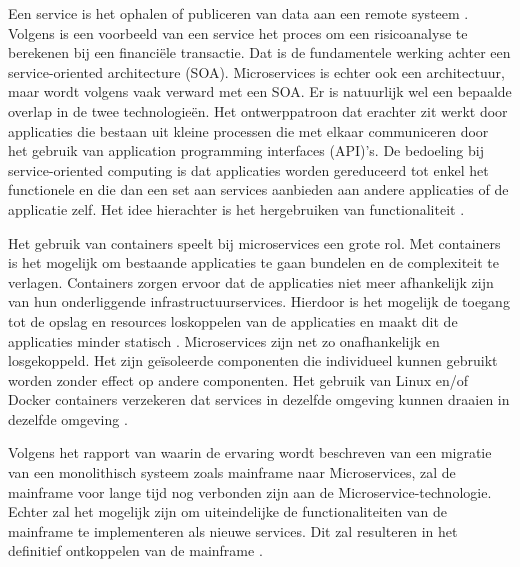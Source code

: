 Een service is het ophalen of publiceren van data aan een remote systeem \autocite{Linthicum2016}. Volgens \citeauthor{Linthicum2016} is een voorbeeld van een service het proces om een risicoanalyse te berekenen bij een financiële transactie. Dat is de fundamentele werking achter een service-oriented architecture (SOA). Microservices is echter ook een architectuur, maar wordt volgens \citeauthor{Linthicum2016} vaak verward met een SOA. Er is natuurlijk wel een bepaalde overlap in de twee technologieën. Het ontwerppatroon dat erachter zit werkt door applicaties die bestaan uit kleine processen die met elkaar communiceren door het gebruik van application programming interfaces (API)'s. De bedoeling bij service-oriented computing is dat applicaties worden gereduceerd tot enkel het functionele en die dan een set aan services aanbieden aan andere applicaties of de applicatie zelf. Het idee hierachter is het hergebruiken van functionaliteit \autocite{Linthicum2016}. 

Het gebruik van containers speelt bij microservices een grote rol. Met containers is het mogelijk om bestaande applicaties te gaan bundelen en de complexiteit te verlagen. Containers zorgen ervoor dat de applicaties niet meer afhankelijk zijn van hun onderliggende infrastructuurservices. Hierdoor is het mogelijk de toegang tot de opslag en resources loskoppelen van de applicaties en maakt dit de applicaties minder statisch \autocite{Linthicum2016a}. Microservices zijn net zo onafhankelijk en losgekoppeld. Het zijn geïsoleerde componenten die individueel kunnen gebruikt worden zonder effect op andere componenten. Het gebruik van Linux en/of Docker containers verzekeren dat services in dezelfde omgeving kunnen draaien in dezelfde omgeving \autocite{Bucchiarone2018}.

Volgens het rapport van \citeauthor{Bucchiarone2018} waarin de ervaring wordt beschreven van een migratie van een monolithisch systeem zoals mainframe naar Microservices, zal de mainframe voor lange tijd nog verbonden zijn aan de Microservice-technologie. Echter zal het mogelijk zijn om uiteindelijke de functionaliteiten van de mainframe te implementeren als nieuwe services. Dit zal resulteren in het definitief ontkoppelen van de mainframe \autocite{Bucchiarone2018}. 


\subsection{}
\label{sec:Workloads migreren naar de cloud}

\subsubsection{}
\label{sec:Het opzetten van een AWS Mainframe Modernizatie runtime omgeving}



